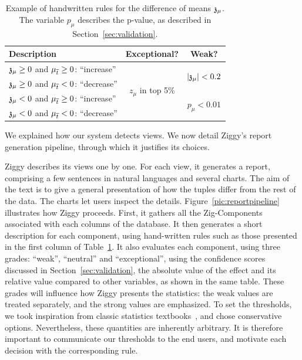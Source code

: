 \begin{table}[t!]
    \centering
    \begin{tabular}{| p{4.2cm} | c | c |}
      \hline
      Description & Exceptional? & Weak?\\
      \hline
      $\mathfrak{z_\mu} \geq 0$ and $\mu_{\overline{t}} \geq 0$: ``increase'' &
          \multirow{4}{*}{$z_\mu$ in top 5\%} & 
            \multirow{2}{*}{$|\mathfrak{z_\mu}| < 0.2$}\\
      $\mathfrak{z_\mu} \geq 0$ and $\mu_{\overline{t}} < 0$: ``decrease'' &
      &\\
      $\mathfrak{z_\mu} < 0$ and $\mu_{\overline{t}} \geq0$: ``increase'' &
       &\multirow{2}{*}{$p_\mu < 0.01$}\\
      $\mathfrak{z_\mu} < 0$ and $\mu_{\overline{t}} < 0$: ``decrease'' &
      &\\
      \hline
    \end{tabular}
    \caption{Example of handwritten rules for the difference of
        means $\mathfrak{z_\mu}$. The variable $p_\mu$ describes the p-value, as
    described in Section~\ref{sec:validation}.} 
\label{tab:handwritten}
\end{table}

We explained how our system detects views. We now detail Ziggy's report generation
pipeline, through which it justifies its choices. 

Ziggy describes its views one by one. For each view, it generates a report,
comprising a few sentences in natural languages and several charts. The aim of
the text is to give a general presentation of how the tuples differ from the
rest of the data. The charts let users inspect the details.
Figure~\ref{pic:reportpipeline} illustrates how Ziggy proceeds. First, it
gathers all the Zig-Components associated with each columns of the database. It
then generates a short description for each component, using hand-written rules
such as those presented in the first column of Table~\ref{tab:handwritten}. It
also evaluates each component, using three grades: ``weak'', ``neutral'' and
``exceptional'', using the confidence scores discussed in
Section~\ref{sec:validation}, the absolute value of the effect and its relative
value compared to other variables, as shown in the same table. These grades
will influence how Ziggy presents the statistics: the weak values are treated
separately, and the strong values are emphasized. To set the thresholds, we
took inspiration from classic statistics textbooks~\cite{cohen1977statistical},
and chose conservative options.  Nevertheless, these quantities are inherently
arbitrary. It is therefore important to communicate our thresholds to the end
users, and motivate each decision with the corresponding rule.

